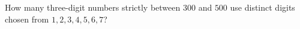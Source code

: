 How many three-digit numbers strictly between $ 300 $ and $ 500 $ use distinct digits chosen from $ 1,2,3,4,5,6,7 $?
